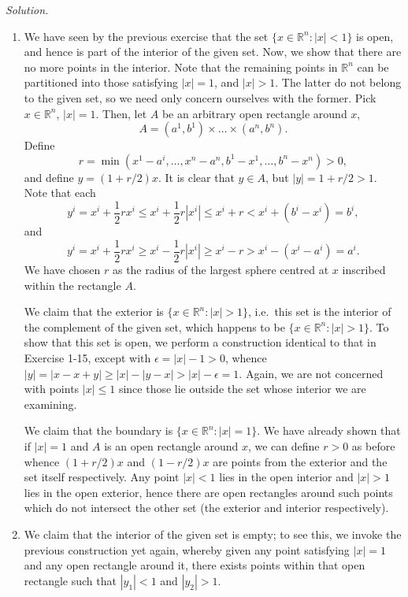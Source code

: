 \documentclass[11pt]{report}
\newcommand{\R}{\mathbb{R}}
\newcommand{\solution}{\noindent\textit{Solution.} }
\begin{document}
    \solution
    \begin{enumerate}
        \item We have seen by the previous exercise that the set $\{x \in \R^n : |x|
        < 1\}$ is open, and hence is part of the interior of the given set. Now, we
        show that there are no more points in the interior. Note that the remaining
        points in $\R^n$ can be partitioned into those satisfying $|x| = 1$, and $|x|
        > 1$. The latter do not belong to the given set, so we need only concern
        ourselves with the former. Pick $x \in \R^n$, $|x| = 1$. Then, let $A$ be an
        arbitrary open rectangle around $x$, \[
            A = (a^1, b^1) \times \dots \times (a^n, b^n).
        \] Define \[
            r = \min(x^1 - a^i, \dots, x^n - a^n, b^1 - x^1, \dots, b^n - x^n) > 0,
        \] and define $y = (1 + r / 2)x$. It is clear that $y \in A$, but $|y| = 1 +
        r / 2 > 1$. Note that each \[
            y^i = x^i + \frac{1}{2}rx^i \leq x^i + \frac{1}{2}r|x^i| \leq x^i + r <
            x^i + (b^i - x^i) = b^i,
        \] and \[
            y^i = x^i + \frac{1}{2}rx^i \geq x^i - \frac{1}{2}r|x^i| \geq x^i - r >
            x^i - (x^i - a^i) = a^i.
        \] We have chosen $r$ as the radius of the largest sphere centred at $x$
        inscribed within the rectangle $A$.

        We claim that the exterior is $\{x \in \R^n : |x| > 1\}$, i.e.\ this set is
        the interior of the complement of the given set, which happens to be $\{x \in
        \R^n : |x| > 1\}$. To show that this set is open, we perform a construction
        identical to that in Exercise 1-15, except with $\epsilon = |x| - 1 > 0$,
        whence $|y| = |x - x + y| \geq |x| - |y - x| > |x| - \epsilon = 1$. Again, we
        are not concerned with points $|x| \leq 1$ since those lie outside the set
        whose interior we are examining.

        We claim that the boundary is $\{x \in \R^n : |x| = 1\}$. We have already
        shown that if $|x| = 1$ and $A$ is an open rectangle around $x$, we can
        define $r > 0$ as before whence $(1 + r / 2)x$ and $(1 - r / 2)x$ are points
        from the exterior and the set itself respectively. Any point $|x| < 1$ lies
        in the open interior and $|x| > 1$ lies in the open exterior, hence there
        are open rectangles around such points which do not intersect the other set
        (the exterior and interior respectively).

        \item We claim that the interior of the given set is empty; to see this, we
        invoke the previous construction yet again, whereby given any point
        satisfying $|x| = 1$ and any open rectangle around it, there exists points
        within that open rectangle such that $|y_1| < 1$ and $|y_2| > 1$.


\end{enumerate}
\end{document}
